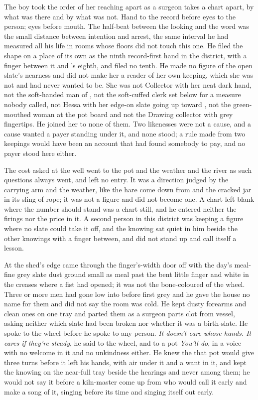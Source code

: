 \scenebreak

The boy took the order of her reaching apart as a surgeon takes a chart apart, by what was there and by what was not. Hand to the record before eyes to the person; eyes before mouth. The half-beat between the looking and the word was the small distance between intention and arrest, the same interval he had measured all his life in rooms whose floors did not touch this one. He filed the shape on a place of its own as the ninth record-first hand in the district, with a finger between it and 's eighth, and filed no tenth. He made no figure of the open slate's nearness and did not make her a reader of her own keeping, which she was not and had never wanted to be. She was not Collector  with her neat dark hand, not the soft-handed man of , not the soft-cuffed clerk set below  for a measure nobody called, not Hessa with her edge-on slate going up toward , not the green-mouthed woman at the pot board and not the Drawing collector with grey fingertips. He joined her to none of them. Two likenesses were not a cause, and a cause wanted a payer standing under it, and none stood; a rule made from two keepings would have been an account that had found somebody to pay, and no payer stood here either.

The cost asked at the well went to the pot and the weather and the river as such questions always went, and left no entry. It was a direction judged by the carrying arm and the weather, like the hare come down from  and the cracked jar in its sling of rope; it was not a figure and did not become one. A chart left blank where the number should stand was a chart still, and he entered neither the firings nor the price in it. A second person in this district was keeping a figure where no slate could take it off, and the knowing sat quiet in him beside the other knowings with a finger between, and did not stand up and call itself a lesson.

At the shed's edge  came through the finger's-width door off  with the day's meal-fine grey slate dust ground small as meal past the bent little finger and white in the creases where a fist had opened; it was not the bone-coloured  of the wheel. Three or more men had gone low into  before first grey and he gave the house no name for them and did not say the room was cold. He kept dusty forearms and clean ones on one tray and parted them as a surgeon parts clot from vessel, asking neither which slate had been broken nor whether it was a birth-slate. He spoke to the wheel before he spoke to any person. \emph{It doesn't care whose hands. It cares if they're steady}, he said to the wheel, and to a pot \emph{You'll do}, in a voice with no welcome in it and no unkindness either. He knew the  that pot would give three turns before it left his hands, with air under it and a want in it, and kept the knowing on the near-full tray beside the hearings and never among them; he would not say it before a kiln-master come up from  who would call it early and make a song of it, singing before its time and singing itself out early.

